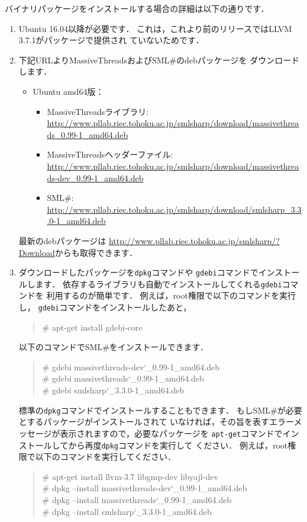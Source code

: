 \documentclass{jbook}
\newcommand{\smlsharp}{SML\#}
\newcommand{\version}{3.3.0}
\newcommand\eurl[1]{{\edef\eurlTMP{{#1}}\expandafter\url\eurlTMP}}
\newenvironment{program}{\begin{quote}\begin{tt}}%
                        {\end{tt}\end{quote}}
\begin{document}
	バイナリパッケージをインストールする場合の詳細は以下の通りです．
\begin{enumerate}
\item
	Ubuntu 16.04以降が必要です．
	これは，これより前のリリースではLLVM 3.7.1がパッケージで提供され
ていないためです．

\item
	下記URLよりMassiveThreadsおよび\smlsharp{}のdebパッケージを
ダウンロードします．
\begin{itemize}
\item Ubuntu amd64版：
\begin{itemize}
\item MassiveThreadsライブラリ: \eurl{http://www.pllab.riec.tohoku.ac.jp/smlsharp/download/massivethreads_0.99-1_amd64.deb}
\item MassiveThreadsヘッダーファイル: \eurl{http://www.pllab.riec.tohoku.ac.jp/smlsharp/download/massivethreads-dev_0.99-1_amd64.deb}
\item \smlsharp{}: \eurl{http://www.pllab.riec.tohoku.ac.jp/smlsharp/download/smlsharp_\version-1_amd64.deb}
\end{itemize}
\end{itemize}
	最新のdebパッケージは
\url{http://www.pllab.riec.tohoku.ac.jp/smlsharp/?Download}からも取得できます．
\item
	ダウンロードしたパッケージを{\tt dpkg}コマンドや
{\tt gdebi}コマンドでインストールします．
	依存するライブラリも自動でインストールしてくれる{\tt gdebi}コマンドを
利用するのが簡単です．
	例えば，root権限で以下のコマンドを実行し，
{\tt gdebi}コマンドをインストールしたあと，
\begin{program}
\# apt-get install gdebi-core
\end{program}
	以下のコマンドで\smlsharp{}をインストールできます．
\begin{program}
\# gdebi massivethreads-dev\char`\_0.99-1\_amd64.deb\\
\# gdebi massivethreads\char`\_0.99-1\_amd64.deb\\
\# gdebi smlsharp\char`\_\version{}-1\_amd64.deb
\end{program}

	標準の{\tt dpkg}コマンドでインストールすることもできます．
	もし\smlsharp{}が必要とするパッケージがインストールされて
いなければ，その旨を表すエラーメッセージが表示されますので，必要なパッケージを
{\tt apt-get}コマンドでインストールしてから再度{\tt dpkg}コマンドを実行して
ください．
	例えば，root権限で以下のコマンドを実行してください．
\begin{program}
\# apt-get install llvm-3.7 libgmp-dev libyajl-dev\\
\# dpkg --install massivethreads-dev\char`\_0.99-1\_amd64.deb\\
\# dpkg --install massivethreads\char`\_0.99-1\_amd64.deb\\
\# dpkg --install smlsharp\char`\_\version{}-1\_amd64.deb
\end{program}
\end{enumerate}
\end{document}
